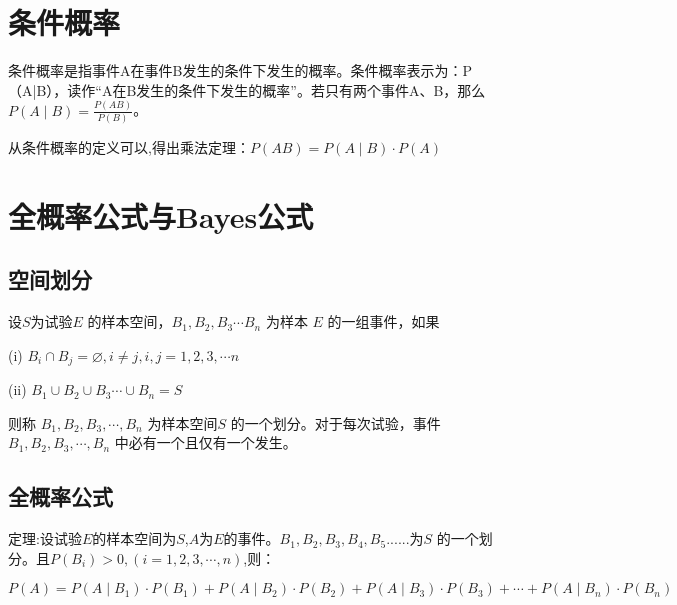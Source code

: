 \section{条件概率}
条件概率是指事件A在事件B发生的条件下发生的概率。条件概率表示为：P（A|B），读作“A在B发生的条件下发生的概率”。若只有两个事件A、B，那么$P(A \mid B)=\displaystyle \frac{P(AB)}{P(B)}$。

从条件概率的定义可以,得出乘法定理：$P(AB) = P(A \mid B) \cdot  P(A) $

\section{全概率公式与Bayes公式}

\subsection{空间划分}
设$S$为试验$E$ 的样本空间，$B_{1},B_{2},B_{3} \cdots B_{n} $ 为样本 $E$ 的一组事件，如果

(i) $B_{i} \cap B_{j} = \varnothing , i \neq j , i,j = 1,2,3, \cdots n $

(ii) $B_{1} \cup  B_{2} \cup  B_{3} \cdots \cup B_{n} = S $ 

则称 $ B_{1}, B_{2}, B_{3}, \cdots , B_{n}  $ 为样本空间$S$ 的一个划分。对于每次试验，事件 $ B_{1}, B_{2}, B_{3}, \cdots , B_{n}  $ 中必有一个且仅有一个发生。




\subsection{全概率公式}

定理:设试验$E$的样本空间为$S$,$A$为$E$的事件。$B_{1},B_{2},B_{3},B_{4},B_{5}......$为$S$ 的一个划分。且$P(B_{i})>0,(i=1,2,3,\cdots,n)$,则：

\[
	P(A) = P(A \mid B _{1} ) \cdot P(B_{1})+P(A \mid B _{2} )\cdot P(B_{2}) +P(A \mid B _{3} )\cdot P(B_{3})+ \cdots + P(A \mid B _{n} ) \cdot P(B_{n})
\]

